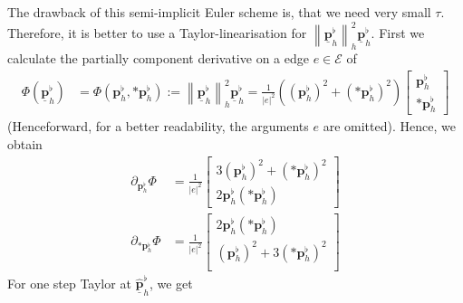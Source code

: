\documentclass[a4paper,11pt]{scrartcl}
\newcommand{\pflh}{\mathbf{p}^{\flat}_{h}}
\newcommand{\PDpflh}{\underline{\mathbf{p}}^{\flat}_{h}}
\newcommand{\PDpflhOld}{\underline{\widehat{\mathbf{p}}}^{\flat}_{h}}
\newcommand{\E}{\mathcal{E}}
\begin{document}
    The drawback of this semi-implicit Euler scheme is, that we need very small \( \tau \).
    Therefore, it is better to use a Taylor-linearisation for  \( \left\| \PDpflh \right\|_{h}^{2}\PDpflh \).
    First we calculate the partially component derivative on a edge \( e\in\E \) of
    \begin{align}
        \Phi\left( \PDpflh \right) &= \Phi \left( \pflh, *\pflh \right)
              :=\left\| \PDpflh \right\|_{h}^{2}\PDpflh 
              = \frac{1}{\left| e \right|^{2}} \left( \left( \pflh \right)^{2} 
                                                  +\left( *\pflh \right)^{2} \right)
                                     \begin{bmatrix}
                                       \pflh \\ *\pflh
                                     \end{bmatrix}
    \end{align}
    (Henceforward, for a better readability, the arguments \( e \) are omitted).
    Hence, we obtain
    \begin{align}
      \partial_{\pflh}\Phi
          &= \frac{1}{\left| e \right|^{2}}
                \begin{bmatrix}
                  3\left( \pflh \right)^{2} + \left( *\pflh \right)^{2} \\
                  2\pflh\left( *\pflh \right)
                \end{bmatrix} \\
      \partial_{*\pflh}\Phi
          &= \frac{1}{\left| e \right|^{2}}
                \begin{bmatrix}
                  2\pflh\left( *\pflh \right) \\
                  \left( \pflh \right)^{2} + 3 \left( *\pflh \right)^{2} \\
                \end{bmatrix}
    \end{align}
    For one step Taylor at \( \PDpflhOld \), we get
\end{document}
